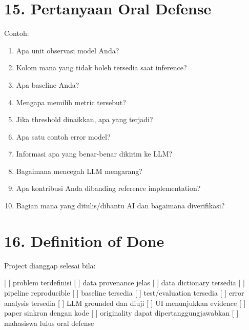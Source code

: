 \documentclass[
  indonesian,
  letterpaper,
  DIV=11,
  numbers=noendperiod]{scrreprt}
\newenvironment{Shaded}{\begin{snugshade}}{\end{snugshade}}
\newcommand{\NormalTok}[1]{\textcolor[rgb]{0.00,0.23,0.31}{#1}}
\providecommand{\tightlist}{%
  \setlength{\itemsep}{0pt}\setlength{\parskip}{0pt}}
\begin{document}

\chapter{15. Pertanyaan Oral Defense}\label{pertanyaan-oral-defense}

Contoh:

\begin{enumerate}
\def\labelenumi{\arabic{enumi}.}
\tightlist
\item
  Apa unit observasi model Anda?
\item
  Kolom mana yang tidak boleh tersedia saat inference?
\item
  Apa baseline Anda?
\item
  Mengapa memilih metric tersebut?
\item
  Jika threshold dinaikkan, apa yang terjadi?
\item
  Apa satu contoh error model?
\item
  Informasi apa yang benar-benar dikirim ke LLM?
\item
  Bagaimana mencegah LLM mengarang?
\item
  Apa kontribusi Anda dibanding reference implementation?
\item
  Bagian mana yang ditulis/dibantu AI dan bagaimana diverifikasi?
\end{enumerate}


\chapter{16. Definition of Done}\label{definition-of-done}

Project dianggap selesai bila:

\begin{Shaded}
\begin{Highlighting}[]
\NormalTok{[ ] problem terdefinisi}
\NormalTok{[ ] data provenance jelas}
\NormalTok{[ ] data dictionary tersedia}
\NormalTok{[ ] pipeline reproducible}
\NormalTok{[ ] baseline tersedia}
\NormalTok{[ ] test/evaluation tersedia}
\NormalTok{[ ] error analysis tersedia}
\NormalTok{[ ] LLM grounded dan diuji}
\NormalTok{[ ] UI menunjukkan evidence}
\NormalTok{[ ] paper sinkron dengan kode}
\NormalTok{[ ] originality dapat dipertanggungjawabkan}
\NormalTok{[ ] mahasiswa lulus oral defense}
\end{Highlighting}
\end{Shaded}
\end{document}
